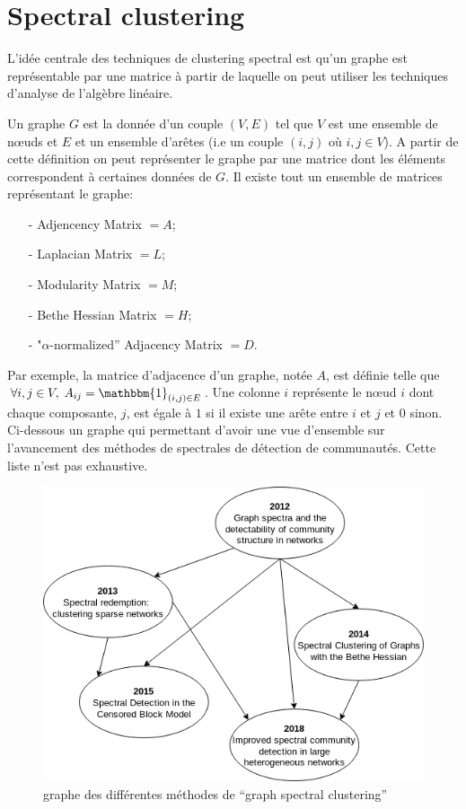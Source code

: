 \section{Spectral clustering}
L'idée centrale des techniques de clustering spectral est qu'un graphe est représentable par une matrice à partir de laquelle on peut utiliser les techniques d'analyse de l'algèbre linéaire.

Un graphe $G$ est la donnée d'un couple $(V, E)$ tel que $V$ est une ensemble de nœuds et $E$ et un ensemble d'arêtes (i.e un couple $(i,j)$ où $i,j \in V$).
A partir de cette définition on peut représenter le graphe par une matrice dont les éléments correspondent à certaines données de $G$.
Il existe tout un ensemble de matrices représentant le graphe:
\begin{itemize}
  	\item[-]  Adjencency Matrix $= A$;
  	\item[-]  Laplacian Matrix $= L$;
  	\item[-]  Modularity Matrix $= M$;
  	\item[-]  Bethe Hessian Matrix $= H$;
  	\item[-]  "$\alpha$-normalized” Adjacency Matrix $= D$.\\
\end{itemize}
Par exemple, la matrice d'adjacence d'un graphe, notée $A$, est définie telle que $\forall i,j \in V, \; A_{ij} = \mathbbm{1}_{(i,j) \in E}$.
Une colonne $i$ représente le nœud $i$ dont chaque composante, $j$, est égale à $1$ si il existe une arête entre $i$ et $j$ et $0$ sinon.\\

Ci-dessous un graphe qui permettant d'avoir une vue d'ensemble sur l'avancement des méthodes de spectrales de détection de communautés.
Cette liste n'est pas exhaustive.
\begin{figure}[H]
\centering
\includegraphics[scale=0.5]{static/graph_research.png}
\caption{graphe des différentes méthodes de ``graph spectral clustering''}
\end{figure}

